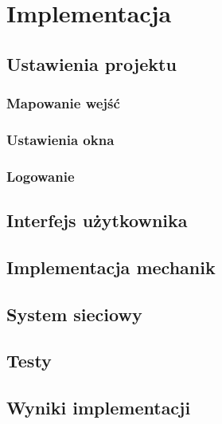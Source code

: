 \chapter{Implementacja}

\section{Ustawienia projektu}
\subsection{Mapowanie wejść}
\subsection{Ustawienia okna}
\subsection{Logowanie}

\section{Interfejs użytkownika}

\section{Implementacja mechanik}

\section{System sieciowy}

\section{Testy}

\section{Wyniki implementacji}

